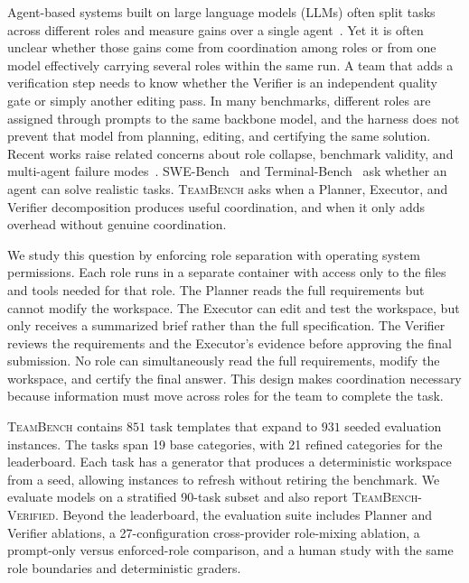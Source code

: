\documentclass{article}
\begin{document}
Agent-based systems built on large language models (LLMs) often split tasks across different roles and measure gains over a single agent~\citep{hong2024metagpt, wu2023autogen, qian2024chatdev, li2023camel, zhuge2024gptswarm, kim2025towards}. Yet it is often unclear whether those gains come from coordination among roles or from one model effectively carrying several roles within the same run. A team that adds a verification step needs to know whether the Verifier is an independent quality gate or simply another editing pass. In many benchmarks, different roles are assigned through prompts to the same backbone model, and the harness does not prevent that model from planning, editing, and certifying the same solution. Recent works raise related concerns about role collapse, benchmark validity, and multi-agent failure modes~\citep{anthropic2025multiagent, cemri2025whyfail, zhu2025abc, li2025hiddenbench}. SWE-Bench~\citep{jimenez2024swebench} and Terminal-Bench~\citep{terminalbench2026} ask whether an agent can solve realistic tasks. \textsc{TeamBench} asks when a Planner, Executor, and Verifier decomposition produces useful coordination, and when it only adds overhead without genuine coordination.

We study this question by enforcing role separation with operating system permissions. Each role runs in a separate container with access only to the files and tools needed for that role. The Planner reads the full requirements but cannot modify the workspace. The Executor can edit and test the workspace, but only receives a summarized brief rather than the full specification. The Verifier reviews the requirements and the Executor’s evidence before approving the final submission. No role can simultaneously read the full requirements, modify the workspace, and certify the final answer. This design makes coordination necessary because information must move across roles for the team to complete the task.

\textsc{TeamBench} contains $851$ task templates that expand to $931$ seeded evaluation instances. The tasks span 19 base categories, with 21 refined categories for the leaderboard. Each task has a generator that produces a deterministic workspace from a seed, allowing instances to refresh without retiring the benchmark. We evaluate models on a stratified 90-task subset and also report \textsc{TeamBench-Verified}. Beyond the leaderboard, the evaluation suite includes Planner and Verifier ablations, a 27-configuration cross-provider role-mixing ablation, a prompt-only versus enforced-role comparison, and a human study with the same role boundaries and deterministic graders.
\end{document}
